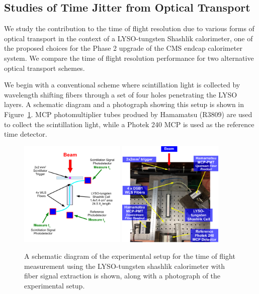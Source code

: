 \documentclass[11pt]{article}
\begin{document}
{\subsection{Studies of Time Jitter from Optical Transport}

We study the contribution to the time of flight resolution due to
various forms of optical transport in the context of a LYSO-tungsten Shashlik
calorimeter, one of the proposed choices for the Phase 2 upgrade of the
CMS endcap calorimeter system. We compare the time of flight resolution
performance for two alternative optical transport schemes. 

We begin with a conventional scheme where scintillation light is collected
by wavelength shifting fibers through a set of four holes penetrating 
the LYSO layers. A schematic diagram and a photograph showing this setup 
is shown in Figure~\ref{fig:ShashlikFiberSetup}. 
MCP photomultiplier tubes produed by Hamamatsu (R3809) are used to collect 
the scintillation light, while a Photek 240 MCP is used as the reference 
time detector. 


\begin{figure}[h] \centering
\includegraphics[width=0.45\textwidth]{figs/ShashlikFiberSetupSchematic} 
\includegraphics[width=0.45\textwidth]{figs/ShashlikFiberSetupPhoto} 
\caption{ A schematic diagram of the experimental setup for the
time of flight measurement using the LYSO-tungsten shashlik calorimeter
with fiber signal extraction is shown, along with a photograph of the
experimental setup. } 
\label{fig:ShashlikFiberSetup}
\end{figure}

}
\end{document}

